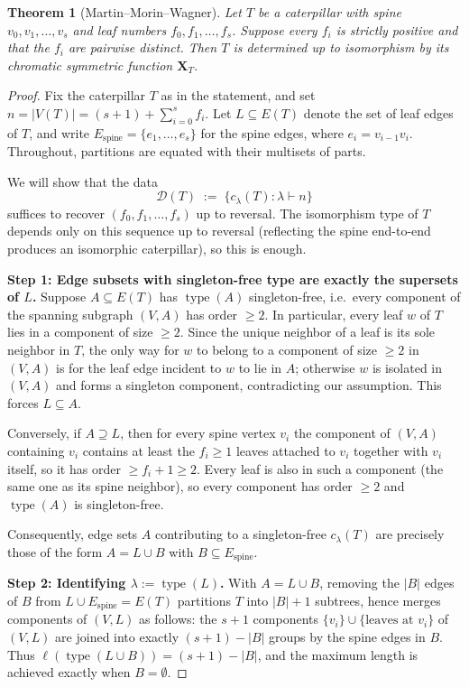\documentclass[11pt]{article}
\newtheorem{theorem}{Theorem}[section]
\theoremstyle{definition}
\newcommand{\X}{\mathbf{X}}
\newcommand{\type}{\operatorname{type}}
\begin{document}
\begin{theorem}[Martin--Morin--Wagner]\label{thm:cat}
Let $T$ be a caterpillar with spine $v_0,v_1,\ldots,v_s$ and leaf
numbers $f_0,f_1,\ldots,f_s$.  Suppose every $f_i$ is strictly positive
and that the $f_i$ are pairwise distinct.  Then $T$ is determined up to
isomorphism by its chromatic symmetric function $\X_T$.
\end{theorem}

\begin{proof}
Fix the caterpillar $T$ as in the statement, and set
$n = |V(T)| = (s+1) + \sum_{i=0}^{s} f_i$.  Let $L \subseteq E(T)$
denote the set of leaf edges of $T$, and write
$E_{\mathrm{spine}} = \{e_1,\ldots,e_s\}$ for the spine edges, where
$e_i = v_{i-1}v_i$.  Throughout, partitions are equated with their
multisets of parts.

We will show that the data
\[
  \mathcal{D}(T) \;:=\; \bigl\{c_\lambda(T) : \lambda\vdash n\bigr\}
\]
suffices to recover $(f_0,f_1,\ldots,f_s)$ up to reversal.  The
isomorphism type of $T$ depends only on this sequence up to reversal
(reflecting the spine end-to-end produces an isomorphic caterpillar),
so this is enough.

\medskip\noindent
\textbf{Step 1: Edge subsets with singleton-free type are exactly
the supersets of $L$.}
Suppose $A\subseteq E(T)$ has $\type(A)$ singleton-free, i.e.\ every
component of the spanning subgraph $(V,A)$ has order $\geq 2$.  In
particular, every leaf $w$ of $T$ lies in a component of size $\geq 2$.
Since the unique neighbor of a leaf is its sole neighbor in $T$, the
only way for $w$ to belong to a component of size $\geq 2$ in $(V,A)$
is for the leaf edge incident to $w$ to lie in $A$; otherwise $w$ is
isolated in $(V,A)$ and forms a singleton component, contradicting our
assumption.  This forces $L\subseteq A$.

Conversely, if $A\supseteq L$, then for every spine vertex $v_i$ the
component of $(V,A)$ containing $v_i$ contains at least the $f_i\geq 1$
leaves attached to $v_i$ together with $v_i$ itself, so it has order
$\geq f_i+1\geq 2$.  Every leaf is also in such a component (the same
one as its spine neighbor), so every component has order $\geq 2$ and
$\type(A)$ is singleton-free.

Consequently, edge sets $A$ contributing to a singleton-free
$c_\lambda(T)$ are precisely those of the form $A = L\cup B$ with
$B\subseteq E_{\mathrm{spine}}$.

\medskip\noindent
\textbf{Step 2: Identifying $\lambda := \type(L)$.}
With $A = L \cup B$, removing the $|B|$ edges of $B$ from
$L\cup E_{\mathrm{spine}} = E(T)$ partitions $T$ into $|B|+1$ subtrees,
hence merges components of $(V,L)$ as follows: the $s+1$ components
$\{v_i\}\cup\{\text{leaves at }v_i\}$ of $(V,L)$ are joined into
exactly $(s+1)-|B|$ groups by the spine edges in $B$.  Thus
$\ell(\type(L\cup B)) = (s+1)-|B|$, and the maximum length is achieved
exactly when $B=\emptyset$.


\end{proof}
\end{document}
